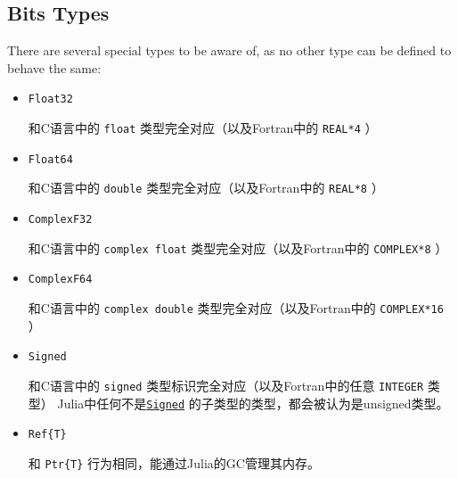 \subsection{Bits Types}



There are several special types to be aware of, as no other type can be defined to behave the same:



\begin{itemize}
\item \texttt{Float32}

和C语言中的 \texttt{float} 类型完全对应（以及Fortran中的 \texttt{REAL*4} ）


\item \texttt{Float64}

和C语言中的 \texttt{double} 类型完全对应（以及Fortran中的 \texttt{REAL*8} ）


\item \texttt{ComplexF32}

和C语言中的 \texttt{complex float} 类型完全对应（以及Fortran中的 \texttt{COMPLEX*8} ）


\item \texttt{ComplexF64}

和C语言中的 \texttt{complex double} 类型完全对应（以及Fortran中的 \texttt{COMPLEX*16} ）


\item \texttt{Signed}

和C语言中的 \texttt{signed} 类型标识完全对应（以及Fortran中的任意 \texttt{INTEGER} 类型） Julia中任何不是\hyperlink{14154866400772377486}{\texttt{Signed}} 的子类型的类型，都会被认为是unsigned类型。

\end{itemize}


\begin{itemize}
\item \texttt{Ref\{T\}}

和 \texttt{Ptr\{T\}} 行为相同，能通过Julia的GC管理其内存。

\end{itemize}


